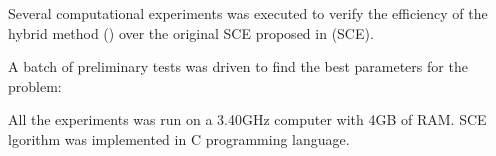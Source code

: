 Several computational experiments was executed to verify the efficiency of the
hybrid method (\scecore) over the original SCE proposed in
\cite{baroni2015shuffled} (SCE).

A batch of preliminary tests was driven to find the best parameters for the
problem:\vspace{-2mm}
\begin{center}
  
\end{center}
All the experiments was run on a 3.40GHz computer with 4GB of RAM.
SCE lgorithm was implemented in C programming language.
